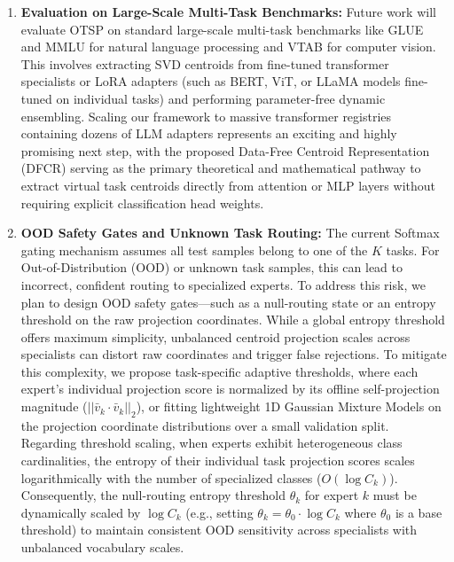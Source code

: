 \begin{enumerate}
    \item \textbf{Evaluation on Large-Scale Multi-Task Benchmarks:} Future work will evaluate OTSP on standard large-scale multi-task benchmarks like GLUE and MMLU for natural language processing and VTAB for computer vision. This involves extracting SVD centroids from fine-tuned transformer specialists or LoRA adapters (such as BERT, ViT, or LLaMA models fine-tuned on individual tasks) and performing parameter-free dynamic ensembling. Scaling our framework to massive transformer registries containing dozens of LLM adapters represents an exciting and highly promising next step, with the proposed Data-Free Centroid Representation (DFCR) serving as the primary theoretical and mathematical pathway to extract virtual task centroids directly from attention or MLP layers without requiring explicit classification head weights.
    \item \textbf{OOD Safety Gates and Unknown Task Routing:} The current Softmax gating mechanism assumes all test samples belong to one of the $K$ tasks. For Out-of-Distribution (OOD) or unknown task samples, this can lead to incorrect, confident routing to specialized experts. To address this risk, we plan to design OOD safety gates—such as a null-routing state or an entropy threshold on the raw projection coordinates. While a global entropy threshold offers maximum simplicity, unbalanced centroid projection scales across specialists can distort raw coordinates and trigger false rejections. To mitigate this complexity, we propose task-specific adaptive thresholds, where each expert's individual projection score is normalized by its offline self-projection magnitude ($||\bar{v}_k \cdot \bar{v}_k||_2$), or fitting lightweight 1D Gaussian Mixture Models on the projection coordinate distributions over a small validation split. Regarding threshold scaling, when experts exhibit heterogeneous class cardinalities, the entropy of their individual task projection scores scales logarithmically with the number of specialized classes ($O(\log C_k)$). Consequently, the null-routing entropy threshold $\theta_{k}$ for expert $k$ must be dynamically scaled by $\log C_k$ (e.g., setting $\theta_k = \theta_0 \cdot \log C_k$ where $\theta_0$ is a base threshold) to maintain consistent OOD sensitivity across specialists with unbalanced vocabulary scales.

\end{enumerate}
